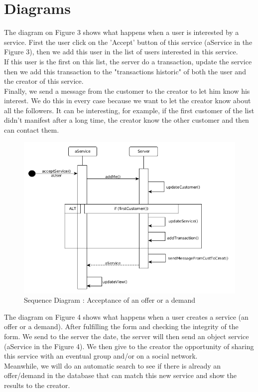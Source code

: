 \section{Diagrams}

The diagram on Figure 3 shows what happens when a user is interested by a service. First the user click on the 'Accept' button of this service (aService in the Figure 3), then we add this user in the list of users interested in this service.
\\ If this user is the first on this list, the server do a transaction, update the service then we add this transaction to the "transactions historic" of both the user and the creator of this service.
\\ Finally, we send a message from the customer to the creator to let him know his interest. We do this in every case because we want to let the creator know about all the followers. It can be interesting, for example, if the first customer of the list didn't manifest after a long time, the creator know the other customer and then can contact them.

\begin{figure}[!ht]
	\begin{center}
		\includegraphics[width=\textwidth]{seq_acceptService.png}
		\caption{Sequence Diagram : Acceptance of an offer or a demand}
		\label{fig:acceptService}
	\end{center}
\end{figure}

The diagram on Figure 4 shows what happens when a user creates a service (an offer or a demand). After fulfilling the form and checking the integrity of the form. We send to the server the date, the server will then send an object service (aService in the Figure 4). We then give to the creator the opportunity of sharing this service with an eventual group and/or on a social network. 
\\ Meanwhile, we will do an automatic search to see if there is already an offer/demand in the database that can match this new service and show the results to the creator.

